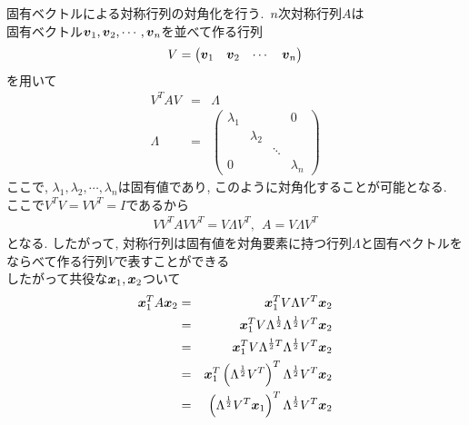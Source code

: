 固有ベクトルによる対称行列の対角化を行う.\ $n$次対称行列$A$は\\
固有ベクトル$\mbox{\boldmath $v$}_{1},\mbox{\boldmath $v$}_{2},\cdots,\mbox{\boldmath $v$}_{n}$を並べて作る行列
\begin{eqnarray*}
    V=\begin{pmatrix}\mbox{\boldmath $v$}_{1}&\mbox{\boldmath $v$}_{2}&\cdots&\mbox{\boldmath $v$}_{n}\end{pmatrix}
\end{eqnarray*}
を用いて
\begin{eqnarray*}
    V^{T}AV &=& \Lambda\\
    \Lambda&=&\begin{pmatrix}\lambda_{1}&&&0\\ & \lambda_{2}&&\\ &&\ddots& \\ 0&&&\lambda_{n}\end{pmatrix}
\end{eqnarray*}
ここで, $\lambda_{1},\lambda_{2},\cdots,\lambda_{n}$は固有値であり, このように対角化することが可能となる.\\
ここで$V^{T}V=VV^{T}=I$であるから
\begin{eqnarray*}
    VV^{T}AVV^{T}=V\Lambda V^{T},\ \ A=V\Lambda V^{T}
\end{eqnarray*}
となる. したがって, 対称行列は固有値を対角要素に持つ行列$\Lambda$と固有ベクトルをならべて作る行列$V$で表すことができる\\
したがって共役な$\mbox{\boldmath $x$}_{1},\mbox{\boldmath $x$}_{2}$ついて
\begin{eqnarray*}
    \mbox{\boldmath $x$}_{1}^{T}A\mbox{\boldmath $x$}_{2}&=&\mbox{\boldmath $x$}_{1}^{T}V\Lambda V^{T}\mbox{\boldmath $x$}_{2}\\
                                                        &=&\mbox{\boldmath $x$}_{1}^{T}V\Lambda^{\frac{1}{2}}\Lambda^{\frac{1}{2}}V^{T}\mbox{\boldmath $x$}_{2}\\
                                                        &=&\mbox{\boldmath $x$}_{1}^{T}V\Lambda^{\frac{1}{2}T}\Lambda^{\frac{1}{2}}V^{T}\mbox{\boldmath $x$}_{2}\\
                                                        &=&\mbox{\boldmath $x$}_{1}^{T}\left(\Lambda^{\frac{1}{2}}V^{T}\right)^{T}\Lambda^{\frac{1}{2}}V^{T}\mbox{\boldmath $x$}_{2}\\
    &=&\left(\Lambda^{\frac{1}{2}}V^{T}\mbox{\boldmath $x$}_{1}\right)^{T}\Lambda^{\frac{1}{2}}V^{T}\mbox{\boldmath $x$}_{2}
\end{eqnarray*}
